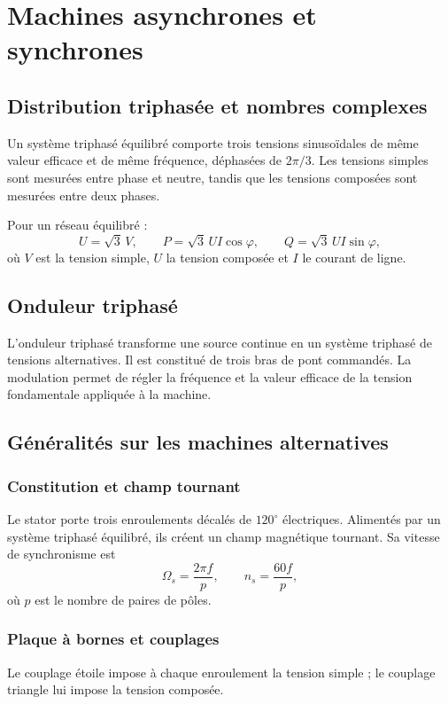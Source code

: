 \chapter{Machines asynchrones et synchrones}

\section{Distribution triphasée et nombres complexes}
Un système triphasé équilibré comporte trois tensions sinusoïdales de même valeur efficace et de même fréquence, déphasées de $2\pi/3$. Les tensions simples sont mesurées entre phase et neutre, tandis que les tensions composées sont mesurées entre deux phases.

\begin{center}\TLTriphasageVectoriel\end{center}

Pour un réseau équilibré :
\[
U=\sqrt{3}\,V,\qquad P=\sqrt{3}\,UI\cos\varphi,\qquad Q=\sqrt{3}\,UI\sin\varphi,
\]
où $V$ est la tension simple, $U$ la tension composée et $I$ le courant de ligne.

\section{Onduleur triphasé}
L'onduleur triphasé transforme une source continue en un système triphasé de tensions alternatives. Il est constitué de trois bras de pont commandés. La modulation permet de régler la fréquence et la valeur efficace de la tension fondamentale appliquée à la machine.

\section{Généralités sur les machines alternatives}
\subsection{Constitution et champ tournant}
Le stator porte trois enroulements décalés de $120^\circ$ électriques. Alimentés par un système triphasé équilibré, ils créent un champ magnétique tournant. Sa vitesse de synchronisme est
\[
\Omega_s=\frac{2\pi f}{p},\qquad n_s=\frac{60f}{p},
\]
où $p$ est le nombre de paires de pôles.

\subsection{Plaque à bornes et couplages}
Le couplage étoile impose à chaque enroulement la tension simple ; le couplage triangle lui impose la tension composée.
\begin{center}\TLCouplagesEtoileTriangle\end{center}

